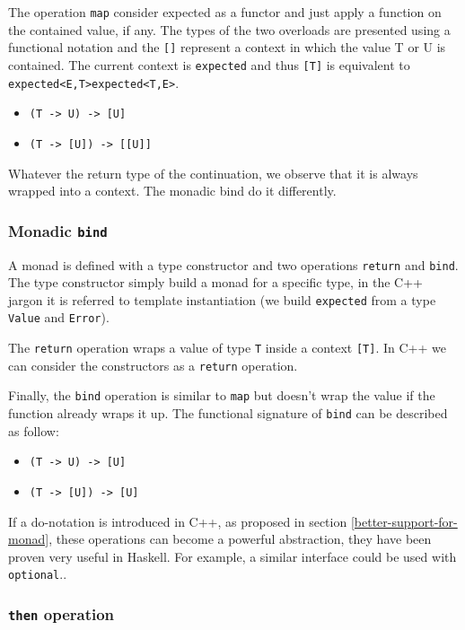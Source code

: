 \documentclass[a4paper,10pt]{article}
\newcommand{\cpp}[1]{\lstinline{#1}}
\newcommand{\suppress}[1]{\colorbox{suppress_color}{#1}}
\newcommand{\update}[1]{\colorbox{update_color}{#1}}
\begin{document}
The operation \cpp{map} consider expected as a functor and just apply a function on the contained value, if any. The types of the two overloads are presented using a functional notation and the \cpp{[]} represent a context in which the value T or U is contained. The current context is \cpp{expected} and thus \cpp{[T]} is equivalent to \suppress{\cpp{expected<E,T>}}\update{\cpp{expected<T,E>}}.

\begin{itemize}
\item \cpp{(T -> U) -> [U]}
\item \cpp{(T -> [U]) -> [[U]]}
\end{itemize}

Whatever the return type of the continuation, we observe that it is always wrapped into a context. The monadic bind do it differently.

\subsubsection{Monadic \cpp{bind}}

A monad is defined with a type constructor and two operations \cpp{return} and \cpp{bind}. The type constructor simply build a monad for a specific type, in the C++ jargon it is referred to template instantiation (we build \cpp{expected} from a type \cpp{Value} and \cpp{Error}).

The \cpp{return} operation wraps a value of type \cpp{T} inside a context \cpp{[T]}. In C++ we can consider the constructors as a \cpp{return} operation.

Finally, the \cpp{bind} operation is similar to \cpp{map} but doesn't wrap the value if the function already wraps it up. The functional signature of \cpp{bind} can be described as follow:

\begin{itemize}
\item \cpp{(T -> U) -> [U]}
\item \cpp{(T -> [U]) -> [U]}
\end{itemize}

If a do-notation is introduced in C++, as proposed in section \ref{better-support-for-monad}, these operations can become a powerful abstraction, they have been proven very useful in Haskell. For example, a similar interface could be used with \cpp{optional}..

\subsubsection{\cpp{then} operation}
\end{document}
